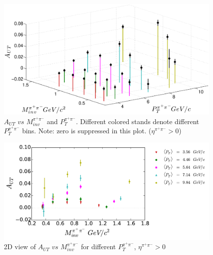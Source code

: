 \documentclass[letterpaper, abstract = on,listof=totoc, bibliography=totoc]{scrreprt}
\newcommand{\ptpair}{P_{T}^{\pi^+\pi^-}}
\newcommand{\mpair}{M_{inv}^{\pi^+\pi^-}}
\newcommand{\etapair}{\eta^{\pi^+\pi^-}}
\begin{document}
\begin{figure}
\begin{center}
\includegraphics[width = 1\textwidth]{ptMass3d82415}
\caption[Asymmetry $vs$ $\mpair$ and $\ptpair$ 2D binning]{$A_{UT}$ $vs$ $\mpair$ and $\ptpair$. Different colored stands denote different $\ptpair$ bins. Note: zero is suppressed in this plot. ($\etapair > 0$)}
\label{fig:3dPtMass}
\end{center}
\end{figure}


\begin{figure}
\begin{center}
\includegraphics[width = 1\textwidth]{Asym2dProjPtMass82415_difMark5}
\caption[2D view of $A_{UT}$ $vs$ $\mpair$ for different $\ptpair$, $\etapair > 0$]{2D view of $A_{UT}$ $vs$ $\mpair$ for different $\ptpair$, $\etapair > 0$}
\label{fig:2dPtMass}
\end{center}
\end{figure}
\end{document}
